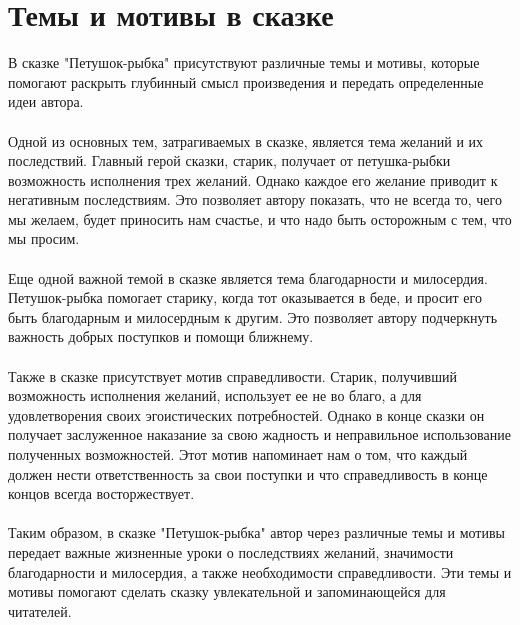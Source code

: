\documentclass{article}
\begin{document}
\newpage
\section{Темы и мотивы в сказке}
В сказке "{}Петушок-рыбка"{} присутствуют различные темы и мотивы, которые помогают раскрыть глубинный смысл произведения и передать определенные идеи автора.\\
~\\
Одной из основных тем, затрагиваемых в сказке, является тема желаний и их последствий. Главный герой сказки, старик, получает от петушка-рыбки возможность исполнения трех желаний. Однако каждое его желание приводит к негативным последствиям. Это позволяет автору показать, что не всегда то, чего мы желаем, будет приносить нам счастье, и что надо быть осторожным с тем, что мы просим.\\
~\\
Еще одной важной темой в сказке является тема благодарности и милосердия. Петушок-рыбка помогает старику, когда тот оказывается в беде, и просит его быть благодарным и милосердным к другим. Это позволяет автору подчеркнуть важность добрых поступков и помощи ближнему.\\
~\\
Также в сказке присутствует мотив справедливости. Старик, получивший возможность исполнения желаний, использует ее не во благо, а для удовлетворения своих эгоистических потребностей. Однако в конце сказки он получает заслуженное наказание за свою жадность и неправильное использование полученных возможностей. Этот мотив напоминает нам о том, что каждый должен нести ответственность за свои поступки и что справедливость в конце концов всегда восторжествует.\\
~\\
Таким образом, в сказке "{}Петушок-рыбка"{} автор через различные темы и мотивы передает важные жизненные уроки о последствиях желаний, значимости благодарности и милосердия, а также необходимости справедливости. Эти темы и мотивы помогают сделать сказку увлекательной и запоминающейся для читателей.
\end{document}
